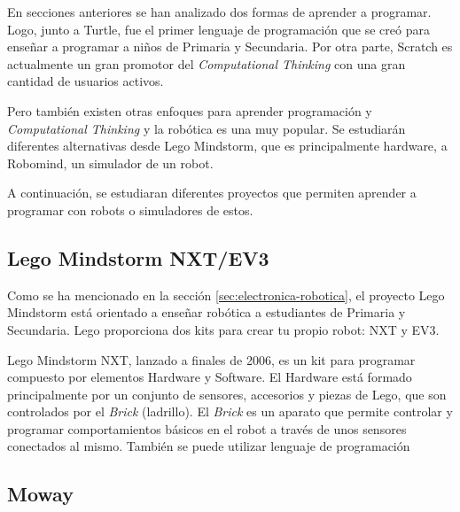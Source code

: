 En secciones anteriores se han analizado dos formas de aprender a programar. Logo, junto a Turtle, fue el primer lenguaje de programación que se creó para enseñar a programar a niños de Primaria y Secundaria. Por otra parte, Scratch es actualmente un gran promotor del \emph{Computational Thinking} con una gran cantidad de usuarios activos.


Pero también existen otras enfoques para aprender programación y \emph{Computational Thinking} y la robótica es una muy popular. Se estudiarán diferentes alternativas desde Lego Mindstorm, que es principalmente hardware, a Robomind, un simulador de un robot.

A continuación, se estudiaran diferentes proyectos que permiten aprender a programar con robots o simuladores de estos.


\subsection{Lego Mindstorm NXT/EV3}
\label{sec:lego-nxt-ec3}


Como se ha mencionado en la sección \ref{sec:electronica-robotica}, el proyecto Lego Mindstorm\cite{lego-mindstorm} está orientado a enseñar robótica a estudiantes de Primaria y Secundaria. Lego proporciona dos kits para crear tu propio robot: NXT y EV3.

Lego Mindstorm NXT, lanzado a finales de 2006, es un kit para programar compuesto por elementos Hardware y Software. El Hardware está formado principalmente por un conjunto de sensores, accesorios y piezas de Lego, que son controlados por el \emph{Brick} (ladrillo). El \emph{Brick} es un aparato que permite controlar y programar comportamientos básicos en el robot a través de unos sensores conectados al mismo. También se puede utilizar lenguaje de programación 


\subsection{Moway}
\label{sec:moway}


